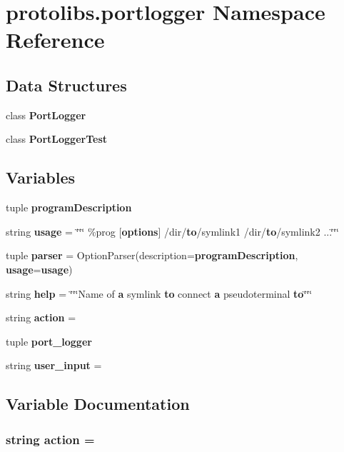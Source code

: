 \section{protolibs.\+portlogger Namespace Reference}
\label{namespaceprotolibs_1_1portlogger}
\subsection*{Data Structures}
\begin{DoxyCompactItemize}
\item 
class {\bf Port\+Logger}
\item 
class {\bf Port\+Logger\+Test}
\end{DoxyCompactItemize}
\subsection*{Variables}
\begin{DoxyCompactItemize}
\item 
tuple {\bf program\+Description}
\item 
string {\bf usage} = \char`\"{}\char`\"{}\char`\"{} \%prog [{\bf options}] /dir/{\bf to}/symlink1 /dir/{\bf to}/symlink2 ...\char`\"{}\char`\"{}\char`\"{}
\item 
tuple {\bf parser} = Option\+Parser(description={\bf program\+Description}, {\bf usage}={\bf usage})
\item 
string {\bf help} = \char`\"{}\char`\"{}\char`\"{}Name of {\bf a} symlink {\bf to} connect {\bf a} pseudoterminal {\bf to}\char`\"{}\char`\"{}\char`\"{}
\item 
string {\bf action} = \textquotesingle{}
\item 
tuple {\bf port\+\_\+logger}
\item 
string {\bf user\+\_\+input} = \textquotesingle{}\textquotesingle{}
\end{DoxyCompactItemize}


\subsection{Variable Documentation}
\subsubsection[{action}]{\setlength{\rightskip}{0pt plus 5cm}string action = \textquotesingle{}}\label{namespaceprotolibs_1_1portlogger_a6a30da6629d5b550c2025d3788d49cb9}


